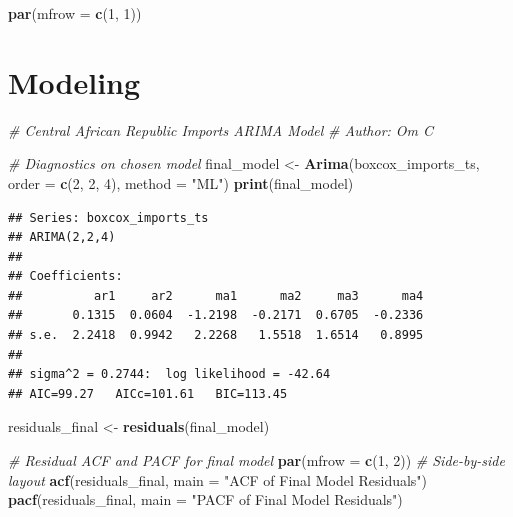 \documentclass[
]{article}
\newenvironment{Shaded}{\begin{snugshade}}{\end{snugshade}}
\newcommand{\AttributeTok}[1]{\textcolor[rgb]{0.13,0.29,0.53}{#1}}
\newcommand{\CommentTok}[1]{\textcolor[rgb]{0.56,0.35,0.01}{\textit{#1}}}
\newcommand{\DecValTok}[1]{\textcolor[rgb]{0.00,0.00,0.81}{#1}}
\newcommand{\FunctionTok}[1]{\textcolor[rgb]{0.13,0.29,0.53}{\textbf{#1}}}
\newcommand{\NormalTok}[1]{#1}
\newcommand{\OtherTok}[1]{\textcolor[rgb]{0.56,0.35,0.01}{#1}}
\newcommand{\StringTok}[1]{\textcolor[rgb]{0.31,0.60,0.02}{#1}}
\begin{document}
\begin{Shaded}
\begin{Highlighting}[]
\FunctionTok{par}\NormalTok{(}\AttributeTok{mfrow =} \FunctionTok{c}\NormalTok{(}\DecValTok{1}\NormalTok{, }\DecValTok{1}\NormalTok{))}
\end{Highlighting}
\end{Shaded}

\section{Modeling}\label{modeling}

\begin{Shaded}
\begin{Highlighting}[]
\CommentTok{\# Central African Republic Imports ARIMA Model}
\CommentTok{\# Author: Om C}

\CommentTok{\# Diagnostics on chosen model}
\NormalTok{final\_model }\OtherTok{\textless{}{-}} \FunctionTok{Arima}\NormalTok{(boxcox\_imports\_ts, }\AttributeTok{order =} \FunctionTok{c}\NormalTok{(}\DecValTok{2}\NormalTok{, }\DecValTok{2}\NormalTok{, }\DecValTok{4}\NormalTok{), }\AttributeTok{method =} \StringTok{"ML"}\NormalTok{)}
\FunctionTok{print}\NormalTok{(final\_model)}
\end{Highlighting}
\end{Shaded}

\begin{verbatim}
## Series: boxcox_imports_ts 
## ARIMA(2,2,4) 
## 
## Coefficients:
##          ar1     ar2      ma1      ma2     ma3      ma4
##       0.1315  0.0604  -1.2198  -0.2171  0.6705  -0.2336
## s.e.  2.2418  0.9942   2.2268   1.5518  1.6514   0.8995
## 
## sigma^2 = 0.2744:  log likelihood = -42.64
## AIC=99.27   AICc=101.61   BIC=113.45
\end{verbatim}

\begin{Shaded}
\begin{Highlighting}[]
\NormalTok{residuals\_final }\OtherTok{\textless{}{-}} \FunctionTok{residuals}\NormalTok{(final\_model)}

\CommentTok{\# Residual ACF and PACF for final model}
\FunctionTok{par}\NormalTok{(}\AttributeTok{mfrow =} \FunctionTok{c}\NormalTok{(}\DecValTok{1}\NormalTok{, }\DecValTok{2}\NormalTok{))  }\CommentTok{\# Side{-}by{-}side layout}
\FunctionTok{acf}\NormalTok{(residuals\_final, }\AttributeTok{main =} \StringTok{"ACF of Final Model Residuals"}\NormalTok{)}
\FunctionTok{pacf}\NormalTok{(residuals\_final, }\AttributeTok{main =} \StringTok{"PACF of Final Model Residuals"}\NormalTok{)}
\end{Highlighting}
\end{Shaded}
\end{document}
